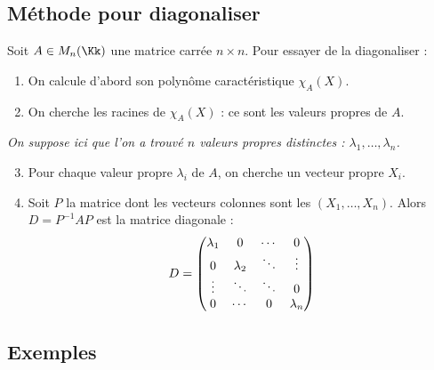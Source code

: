 \documentclass[11pt, class=report,crop=false]{standalone}
\begin{document}
\subsection{Méthode pour diagonaliser}


Soit $A \in M_n(\Kk)$ une matrice carrée $n \times n$. 
Pour essayer de la diagonaliser :
\begin{enumerate}
  \item On calcule d'abord son polynôme caractéristique $\chi_A(X)$.
  \item On cherche les racines de $\chi_A(X)$ : ce sont les valeurs propres de $A$.
\end{enumerate} 


\emph{On suppose ici que l'on a trouvé $n$ valeurs propres distinctes : $\lambda_1,\ldots,\lambda_n$.}

\begin{enumerate}  
  \setcounter{enumi}{2}
  \item Pour chaque valeur propre $\lambda_i$ de $A$, on cherche un vecteur propre $X_i$.
  
  \item Soit $P$ la matrice dont les vecteurs colonnes sont les $(X_1,\ldots,X_n)$.
  Alors $D=P^{-1}AP$ est la matrice diagonale :
  $$D = \begin{pmatrix}
\lambda_{1}&0&\cdots&0 \cr
0&\lambda_{2}&\ddots&\vdots\cr
\vdots&\ddots& \ddots &0\cr
0&\cdots&0& \lambda_{n}
\end{pmatrix}$$
 
 
 \end{enumerate} 
 

\subsection{Exemples}
\end{document}
